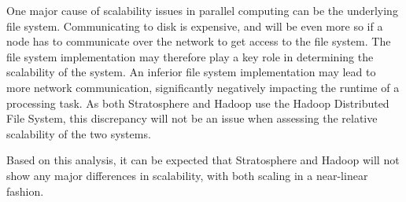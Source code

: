 One major cause of scalability issues in parallel computing can be the underlying file system. Communicating to disk is expensive, and will be even more so if a node has to communicate over the network to get access to the file system. The file system implementation may therefore play a key role in determining the scalability of the system. An inferior file system implementation may lead to more network communication, significantly negatively impacting the runtime of a processing task. As both Stratosphere and Hadoop use the Hadoop Distributed File System, this discrepancy will not be an issue when assessing the relative scalability of the two systems.

Based on this analysis, it can be expected that Stratosphere and Hadoop will not show any major differences in scalability, with both scaling in a near-linear fashion.